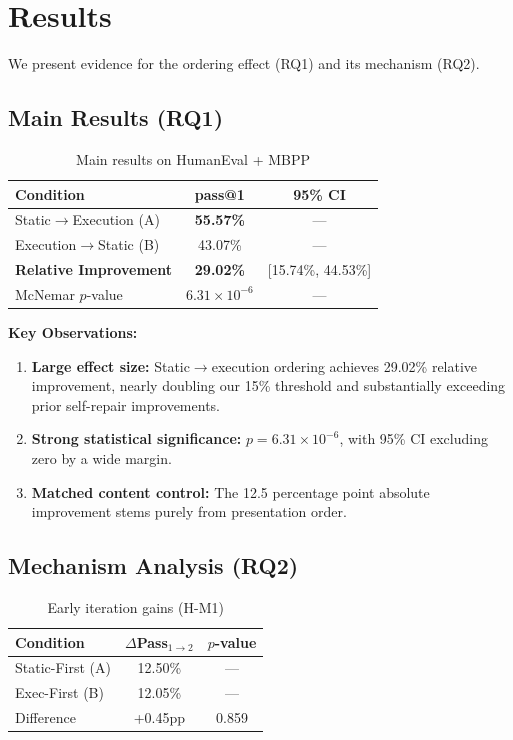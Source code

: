 \section{Results}
\label{sec:results}

We present evidence for the ordering effect (RQ1) and its mechanism (RQ2).

\subsection{Main Results (RQ1)}

\begin{table}[h]
\centering
\caption{Main results on HumanEval + MBPP}
\label{tab:main_results}
\begin{tabular}{@{}lcc@{}}
\toprule
Condition & pass@1 & 95\% CI \\
\midrule
Static$\rightarrow$Execution (A) & \textbf{55.57\%} & --- \\
Execution$\rightarrow$Static (B) & 43.07\% & --- \\
\midrule
\textbf{Relative Improvement} & \textbf{29.02\%} & [15.74\%, 44.53\%] \\
McNemar $p$-value & $6.31\times10^{-6}$ & --- \\
\bottomrule
\end{tabular}
\end{table}

\textbf{Key Observations:}

\begin{enumerate}
    \item \textbf{Large effect size:} Static$\rightarrow$execution ordering achieves 29.02\% relative improvement, nearly doubling our 15\% threshold and substantially exceeding prior self-repair improvements.

    \item \textbf{Strong statistical significance:} $p = 6.31\times10^{-6}$, with 95\% CI excluding zero by a wide margin.

    \item \textbf{Matched content control:} The 12.5 percentage point absolute improvement stems purely from presentation order.
\end{enumerate}

\subsection{Mechanism Analysis (RQ2)}

\begin{table}[h]
\centering
\caption{Early iteration gains (H-M1)}
\label{tab:early_gains}
\begin{tabular}{@{}lcc@{}}
\toprule
Condition & $\Delta$Pass$_{1\rightarrow2}$ & $p$-value \\
\midrule
Static-First (A) & 12.50\% & --- \\
Exec-First (B) & 12.05\% & --- \\
\midrule
Difference & +0.45pp & 0.859 \\
\bottomrule
\end{tabular}
\end{table}


